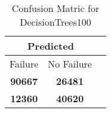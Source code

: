 \begin{table}[] 
\caption{Confusion Matric for DecisionTrees100} 
\label{Table: Prediction Accuracy-DMDDecisionTrees100OnlySunEKF-combinationReflectionEKF-top2-Reflection} 
\centering 
\begin{tabular} 
 {@{}ccc@{}} 
\toprule 
\multicolumn{2}{c}{\textbf{Predicted}}
 \\ \midrule 
\multicolumn{1}{|c|}{Failure} & 
\multicolumn{1}{c|}{No Failure}
 \\ \midrule 
\multicolumn{1}{|c|}{\color{green}\textbf{90667}} & 
\multicolumn{1}{c|}{\color{red}\textbf{26481}}
 \\ \midrule 
\multicolumn{1}{|c|}{\color{red}\textbf{12360}} & 
\multicolumn{1}{c|}{\color{green}\textbf{40620}}
 \\ \bottomrule 
\end{tabular} 
\end{table} 

